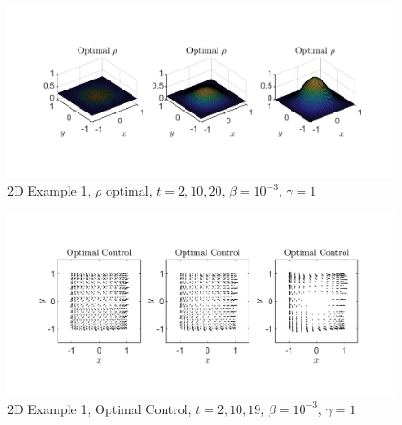 \documentclass[11pt, a4paper]{article}
\theoremstyle{definition}
\begin{document}
\begin{figure}[h]
	\includegraphics[scale=0.3]{Optrho2Dg1.jpg}
	\caption{2D Example 1, $\rho$ optimal, $t= 2,10,20$, $\beta = 10^{-3}$, $\gamma = 1$}
	\label{Fig2D2}
\end{figure}
\begin{figure}[h]
	\includegraphics[scale=0.3]{OC2Dg1.jpg}
	\caption{2D Example 1, Optimal Control, $t= 2,10,19$, $\beta = 10^{-3}$, $\gamma = 1$}
	\label{Fig2D3}
\end{figure}
\end{document}
